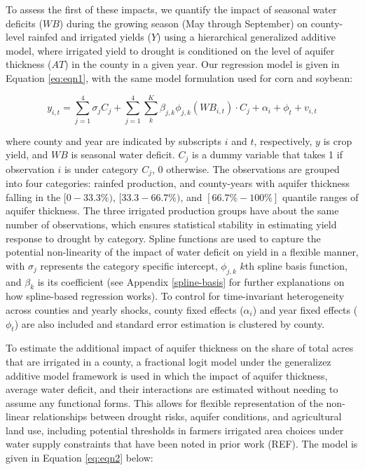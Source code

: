 \documentclass[
]{article}
\begin{document}
To assess the first of these impacts, we quantify the impact of seasonal water deficits (\(WB\)) during the growing season (May through September) on county-level rainfed and irrigated yields (\(Y\)) using a hierarchical generalized additive model, where irrigated yield to drought is conditioned on the level of aquifer thickness (\(AT\)) in the county in a given year. Our regression model is given in Equation \eqref{eq:eqn1}, with the same model formulation used for corn and soybean:

\begin{equation}
y_{i,t} = \sum_{j=1}^4 \sigma_j C_j + \sum_{j=1}^4 \sum_{k}^K \beta_{j,k}\phi_{j,k}(WB_{i,t})\cdot C_j  + \alpha_i + \phi_t + v_{i,t} \label{eq:eqn1}
\end{equation}

where county and year are indicated by subscripts \(i\) and \(t\), respectively, \(y\) is crop yield, and \(WB\) is seasonal water deficit. \(C_j\) is a dummy variable that takes 1 if observation \(i\) is under category \(C_j\), 0 otherwise. The observations are grouped into four categories: rainfed production, and county-years with aquifer thickness falling in the \([0-33.3\%)\), \([33.3-66.7\%)\), and \([66.7\% - 100\%]\) quantile ranges of aquifer thickness. The three irrigated production groups have about the same number of observations, which ensures statistical stability in estimating yield response to drought by category. Spline functions are used to capture the potential non-linearity of the impact of water deficit on yield in a flexible manner, with \(\sigma_j\) represents the category specific intercept, \(\phi_{j,k}\) \(k\)th spline basis function, and \(\beta_k\) is its coefficient (see Appendix \ref{spline-basis} for further explanations on how spline-based regression works). To control for time-invariant heterogeneity across counties and yearly shocks, county fixed effects (\(\alpha_i\)) and year fixed effects (\(\phi_t\)) are also included and standard error estimation is clustered by county.

To estimate the additional impact of aquifer thickness on the share of total acres that are irrigated in a county, a fractional logit model under the generalizez additive model framework is used in which the impact of aquifer thickness, average water deficit, and their interactions are estimated without needing to assume any functional forms. This allows for flexible representation of the non-linear relationships between drought risks, aquifer conditions, and agricultural land use, including potential thresholds in farmers irrigated area choices under water supply constraints that have been noted in prior work (REF). The model is given in Equation \eqref{eq:eqn2} below:
\end{document}
